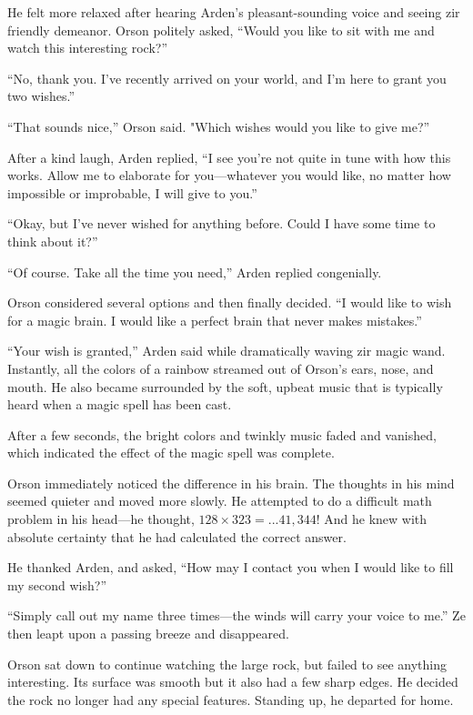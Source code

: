 He felt more relaxed after hearing Arden's pleasant-sounding voice and seeing zir friendly demeanor. Orson politely asked, “Would you like to sit with me and watch this interesting rock?”

“No, thank you. I've recently arrived on your world, and I'm here to grant you two wishes.”

“That sounds nice,” Orson said. "Which wishes would you like to give me?”

After a kind laugh, Arden replied, “I see you're not quite in tune with how this works. Allow me to elaborate for you—whatever you would like, no matter how impossible or improbable, I will give to you.”

“Okay, but I've never wished for anything before. Could I have some time to think about it?”

“Of course. Take all the time you need,” Arden replied congenially.

Orson considered several options and then finally decided. “I would like to wish for a magic brain. I would like a perfect brain that never makes mistakes.”

“Your wish is granted,” Arden said while dramatically waving zir magic wand. Instantly, all the colors of a rainbow streamed out of Orson's ears, nose, and mouth. He also became surrounded by the soft, upbeat music that is typically heard when a magic spell has been cast.

After a few seconds, the bright colors and twinkly music faded and vanished, which indicated the effect of the magic spell was complete.

Orson immediately noticed the difference in his brain. The thoughts in his mind seemed quieter and moved more slowly. He attempted to do a difficult math problem in his head—he thought, $128 \times 323 = ... 41,344$! And he knew with absolute certainty that he had calculated the correct answer.

He thanked Arden, and asked, “How may I contact you when I would like to fill my second wish?”

“Simply call out my name three times—the winds will carry your voice to me.” Ze then leapt upon a passing breeze and disappeared.

Orson sat down to continue watching the large rock, but failed to see anything interesting. Its surface was smooth but it also had a few sharp edges. He decided the rock no longer had any special features. Standing up, he departed for home.

\timesep


